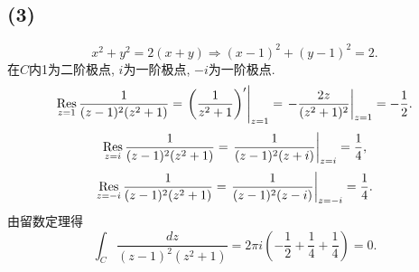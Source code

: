 \documentclass[11pt,a4paper]{article}
\newcommand{\res}[1]{\mathop{\Res}\limits_{#1}}
\begin{document}
\subsection*{(3)}
$$x^2+y^2=2(x+y)\Longrightarrow (x-1)^2+(y-1)^2=2.$$
在$C$内1为二阶极点, $i$为一阶极点, $-i$为一阶极点.
$$\res{z=1}\frac{1}{(z-1)^2(z^2+1)}=\left.\left(\frac{1}{z^2+1}\right)'\right|_{z=1}=\left.-\frac{2z}{(z^2+1)^2}\right|_{z=1}=-\frac{1}{2}.$$
$$\res{z=i}\frac{1}{(z-1)^2(z^2+1)}=\left.\frac{1}{(z-1)^2(z+i)}\right|_{z=i}=\frac{1}{4},$$
$$\res{z=-i}\frac{1}{(z-1)^2(z^2+1)}=\left.\frac{1}{(z-1)^2(z-i)}\right|_{z=-i}=\frac{1}{4}.$$
由留数定理得
$$\int_C\frac{dz}{(z-1)^2(z^2+1)}=2\pi i\left(-\frac{1}{2}+\frac{1}{4}+\frac{1}{4}\right)=0.$$
\end{document}
